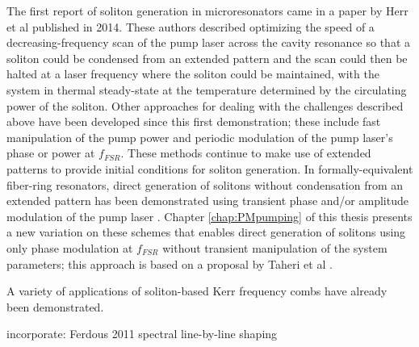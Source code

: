 {The first report of soliton generation in microresonators came in a paper by Herr et al published in 2014\cite{Herr2014}. These authors described optimizing the speed of a decreasing-frequency scan of the pump laser across the cavity resonance so that a soliton could be condensed from an extended pattern and the scan could then be halted at a laser frequency where the soliton could be maintained, with the system in thermal steady-state at the temperature determined by the circulating power of the soliton. Other approaches for dealing with the challenges described above have been developed since this first demonstration; these include fast manipulation of the pump power \cite{Brash2015,Yi2015} and periodic modulation of the pump laser's phase or power at $f_{FSR}$\cite{Lobanov2015,Obrzud2017}. These methods continue to make use of extended patterns to provide initial conditions for soliton generation. In formally-equivalent fiber-ring resonators, direct generation of solitons without condensation from an extended pattern has been demonstrated using transient phase and/or amplitude modulation of the pump laser \cite{Jang1,Jang2,AMpaper}. Chapter \ref{chap:PMpumping} of this thesis presents a new variation on these schemes that enables direct generation of solitons using only phase modulation at $f_{FSR}$ without transient manipulation of the system parameters; this approach is based on a proposal by Taheri et al \cite{Taheri2016}. 

A variety of applications of soliton-based Kerr frequency combs have already been demonstrated. 

incorporate:
Ferdous 2011 spectral line-by-line shaping



%



}
